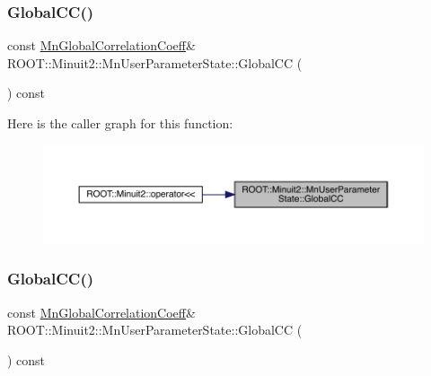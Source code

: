 \mbox{\label{classROOT_1_1Minuit2_1_1MnUserParameterState_a92905c9d64bbd5367b339826ca358ee8}} 
\subsubsection{\texorpdfstring{GlobalCC()}{GlobalCC()}\hspace{0.1cm}{\footnotesize\ttfamily [1/3]}}
{\footnotesize\ttfamily const \mbox{\hyperlink{classROOT_1_1Minuit2_1_1MnGlobalCorrelationCoeff}{Mn\+Global\+Correlation\+Coeff}}\& R\+O\+O\+T\+::\+Minuit2\+::\+Mn\+User\+Parameter\+State\+::\+Global\+CC (\begin{DoxyParamCaption}{ }\end{DoxyParamCaption}) const\hspace{0.3cm}{\ttfamily [inline]}}

Here is the caller graph for this function\+:
\nopagebreak
\begin{figure}[H]
\begin{center}
\leavevmode
\includegraphics[width=350pt]{d3/de0/classROOT_1_1Minuit2_1_1MnUserParameterState_a92905c9d64bbd5367b339826ca358ee8_icgraph}
\end{center}
\end{figure}
\mbox{\label{classROOT_1_1Minuit2_1_1MnUserParameterState_a92905c9d64bbd5367b339826ca358ee8}} 
\subsubsection{\texorpdfstring{GlobalCC()}{GlobalCC()}\hspace{0.1cm}{\footnotesize\ttfamily [2/3]}}
{\footnotesize\ttfamily const \mbox{\hyperlink{classROOT_1_1Minuit2_1_1MnGlobalCorrelationCoeff}{Mn\+Global\+Correlation\+Coeff}}\& R\+O\+O\+T\+::\+Minuit2\+::\+Mn\+User\+Parameter\+State\+::\+Global\+CC (\begin{DoxyParamCaption}{ }\end{DoxyParamCaption}) const\hspace{0.3cm}{\ttfamily [inline]}}

